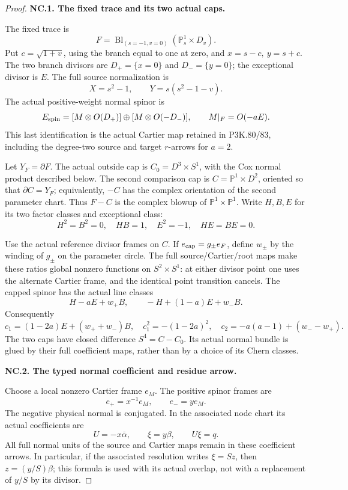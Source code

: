 \begin{proof}
\par\medskip\noindent\textbf{NC.1. The fixed trace and its two actual caps.}\par\nopagebreak[4]

The fixed trace is
\[
 F=\operatorname{Bl}_{(s=-1,v=0)}(\mathbb P^1_s\times D_v).
\]
Put \(c=\sqrt{1+v}\), using the branch equal to one at zero, and
\(x=s-c,\ y=s+c\). The two branch divisors are \(D_+=\{x=0\}\) and
\(D_-=\{y=0\}\); the exceptional divisor is \(E\). The full source normalization is
\[
 X=s^2-1,\qquad Y=s(s^2-1-v).
\]
The actual positive-weight normal spinor is
\[
 E_{\rm spin}=
 [M\otimes O(D_+)]\oplus[M\otimes O(-D_-)],
 \qquad M|_F=O(-aE).
\]
This last identification is the actual Cartier map retained in P3K.80/83, including the degree-two source and target \(r\)-arrows for \(a=2\).

Let \(Y_F=\partial F\). The actual outside cap is \(C_0=D^3\times S^1\), with the Cox normal product described below. The second comparison cap is \(C=\mathbb P^1\times D^2\), oriented so that \(\partial C=Y_F\); equivalently, \(-C\) has the complex orientation of the second parameter chart. Thus \(F-C\) is the complex blowup of \(\mathbb P^1\times\mathbb P^1\). Write \(H,B,E\) for its two factor classes and exceptional class:
\[
 H^2=B^2=0,\quad HB=1,\quad E^2=-1,\quad HE=BE=0.
\]

Use the actual reference divisor frames on \(C\). If
\(e_{\rm cap}=g_\pm e_F\), define \(w_\pm\) by the winding of \(g_\pm\) on the parameter circle. The full source/Cartier/root maps make these ratios global nonzero functions on \(S^2\times S^1\): at either divisor point one uses the alternate Cartier frame, and the identical point transition cancels. The capped spinor has the actual line classes
\[
 H-aE+w_+B,\qquad -H+(1-a)E+w_-B.
\]
Consequently
\[
 c_1=(1-2a)E+(w_++w_-)B,\quad
 c_1^2=-(1-2a)^2,\quad
 c_2=-a(a-1)+(w_--w_+).
\]
The two caps have closed difference
\(S^4=C-C_0\). Its actual normal bundle is glued by their full coefficient maps, rather than by a choice of its Chern classes.

\par\medskip\noindent\textbf{NC.2. The typed normal coefficient and residue arrow.}\par\nopagebreak[4]

Choose a local nonzero Cartier frame \(e_M\). The positive spinor frames are
\[
 e_+=x^{-1}e_M,\qquad e_-=y e_M.
\]
The negative physical normal is conjugated. In the associated node chart its actual coefficients are
\[
 U=-x\overline{\alpha},\qquad \xi=y\beta,\qquad
 U\xi=q.
\]
All full normal units of the source and Cartier maps remain in these coefficient arrows. In particular, if the associated resolution writes
\(\xi=S z\), then \(z=(y/S)\beta\); this formula is used with its actual overlap, not with a replacement of \(y/S\) by its divisor.


\end{proof}
